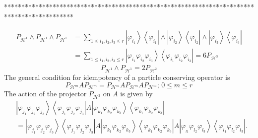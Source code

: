 \documentclass[aps,preprint]{revtex4}%
\begin{document}
********************************************************************************************%

\begin{align}
P_{\mathcal{H}^{1}}\wedge P_{\mathcal{H}^{1}}\wedge P_{\mathcal{H}^{1}}  &
=\sum_{1\leq i_{1},i_{2},i_{3}\leq r}\left\vert \varphi_{i_{1}}\right\rangle
\left\langle \varphi_{i_{1}}\right\vert \wedge\left\vert \varphi_{i_{2}%
}\right\rangle \left\langle \varphi_{i_{2}}\right\vert \wedge\left\vert
\varphi_{i_{3}}\right\rangle \left\langle \varphi_{i_{3}}\right\vert \\
&  =\sum_{1\leq i_{1},i_{2},i_{3}\leq r}\left\vert \varphi_{i_{1}}%
\varphi_{i_{2}}\varphi_{i_{3}}\right\rangle \left\langle \varphi_{i_{1}%
}\varphi_{i_{2}}\varphi_{i_{3}}\right\vert =6P_{\mathcal{H}^{3}}%
\end{align}%
\begin{equation}
P_{\mathcal{H}^{1}}\wedge P_{\mathcal{H}^{1}}=2P_{\mathcal{H}^{2}}%
\end{equation}
The general condition for idempotency of a particle conserving operator is
\begin{equation}
P_{\mathcal{H}^{m}}AP_{\mathcal{H}^{m}}=P_{\mathcal{H}^{m}}AP_{\mathcal{H}%
^{m}}AP_{\mathcal{H}^{m}};\,0\leq m\leq r
\end{equation}
The action of the projector $P_{\mathcal{H}^{3}}$ on $A$ is given by
\begin{align}
&  \left\vert \varphi_{j_{1}}\varphi_{j_{2}}\varphi_{j_{3}}\right\rangle
\left\langle \varphi_{j_{1}}\varphi_{j_{2}}\varphi_{j_{3}}\right\vert
A\left\vert \varphi_{k_{1}}\varphi_{k_{2}}\varphi_{k_{3}}\right\rangle
\left\langle \varphi_{k_{1}}\varphi_{k_{2}}\varphi_{k_{3}}\right\vert
\nonumber\\
&  =\left\vert \varphi_{j_{1}}\varphi_{j_{2}}\varphi_{j_{3}}\right\rangle
\left\langle \varphi_{j_{1}}\varphi_{j_{2}}\varphi_{j_{3}}\right\vert
A\left\vert \varphi_{k_{1}}\varphi_{k_{2}}\varphi_{k_{3}}\right\rangle
\left\langle \varphi_{k_{1}}\varphi_{k_{2}}\varphi_{k_{3}}\right\vert
A\left\vert \varphi_{_{l1}}\varphi_{l_{2}}\varphi_{l_{3}}\right\rangle
\left\langle \varphi_{l_{1}}\varphi_{l_{2}}\varphi_{l_{3}}\right\vert .
\end{align}
\end{document}
